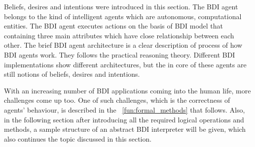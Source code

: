 Beliefs, desires and intentions were introduced in this section.
The BDI agent belongs to the kind of intelligent agents which are autonomous, computational entities.
The BDI agent executes actions on the basis of BDI model that containing three main attributes which have close relationship between each other.
The brief BDI agent architecture is a clear description of process of how BDI agents work.
They follows the practical reasoning theory.
Different BDI implementations show different architectures, but the in core of these agents are still notions of beliefs, desires and intentions.

With an increasing number of BDI applications coming into the human life, more challenges come up too.
One of such challenges, which is the correctness of agents' behaviour, is described in the ~\autoref{fun:formal_methods} that follows.
Also, in the following section after introducing all the required logical operations and methods, a sample structure of an abstract BDI interpreter will be given, which also continues the topic discussed in this section.
